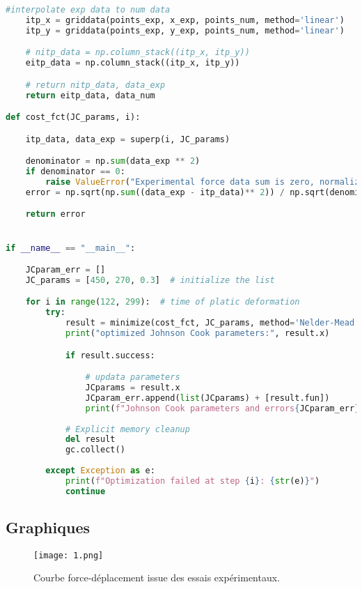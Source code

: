 \documentclass[12pt,a4paper]{article}
\begin{document}
\begin{lstlisting}[language=Python, caption={Optimisation superposition}]
    #interpolate exp data to num data
    itp_x = griddata(points_exp, x_exp, points_num, method='linear')
    itp_y = griddata(points_exp, y_exp, points_num, method='linear')

    # nitp_data = np.column_stack((itp_x, itp_y))
    eitp_data = np.column_stack((itp_x, itp_y))

    # return nitp_data, data_exp
    return eitp_data, data_num

def cost_fct(JC_params, i):

    itp_data, data_exp = superp(i, JC_params)

    denominator = np.sum(data_exp ** 2)
    if denominator == 0:
        raise ValueError("Experimental force data sum is zero, normalization is invalid.")
    error = np.sqrt(np.sum((data_exp - itp_data)** 2)) / np.sqrt(denominator)

    return error


if __name__ == "__main__":

    JCparam_err = []
    JC_params = [450, 270, 0.3]  # initialize the list

    for i in range(122, 299):  # time of platic deformation
        try:
            result = minimize(cost_fct, JC_params, method='Nelder-Mead', options={'disp': False, 'maxiter': 50}, args=(i,))
            print("optimized Johnson Cook parameters:", result.x) 

            if result.success:

                # updata parameters
                JCparams = result.x
                JCparam_err.append(list(JCparams) + [result.fun])
                print(f"Johnson Cook parameters and errors{JCparam_err}")
        
            # Explicit memory cleanup
            del result
            gc.collect()
        
        except Exception as e:
            print(f"Optimization failed at step {i}: {str(e)}")
            continue
\end{lstlisting}

\subsection{Graphiques}

\begin{figure}[h]
    \centering
    \texttt{[image: 1.png]}
    \caption{Courbe force-déplacement issue des essais expérimentaux.}
    \label{fig:force_dep_exp}
\end{figure}
\end{document}
